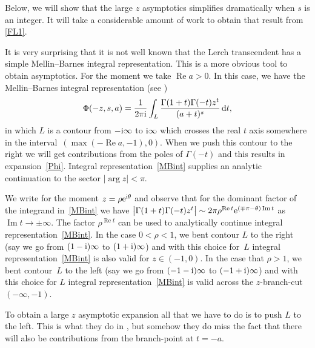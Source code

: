 \documentclass[pdftex]{sigma}
\numberwithin{equation}{section}
\def\expe{{\rm e}}
\def\iunit{{\rm i}}
\def\id{\,{\rm d}}
\begin{document}
Below, we will show that the large $z$ asymptotics simplifies dramatically
when $s$ is an integer. It will take a considerable amount of work to
obtain that result from \eqref{FL1}.

It is very surprising that it is not well known that the Lerch transcendent has a simple
Mellin--Barnes integral representation. This is a more obvious tool to obtain asymptotics.
For the moment we take $\operatorname{Re} a>0$. In this case,
we have the Mellin--Barnes integral representation (see \cite[equation~(3.11)]{Srivastava2011})
\begin{equation}\label{MBint}
 \Phi(-z,s,a)=\frac1{2\pi\iunit}\int_L
 \frac{\Gamma(1+t)\Gamma(-t)z^t}{(a+t)^s}\id t,
\end{equation}
in which $L$ is a contour from $-\iunit\infty$ to $\iunit\infty$ which crosses the
real $t$ axis somewhere in the interval~$(\max(-\operatorname{Re} a,-1),0)$. When we push this contour to the
right we will get contributions from the poles of $\Gamma(-t)$ and this results in
expansion~\eqref{Phi}. Integral representation~\eqref{MBint} supplies an
analytic continuation to the sector $|\arg z|<\pi$.

We write for the moment $z=\rho\expe^{\iunit\theta}$ and observe that for the dominant factor
of the integrand in~\eqref{MBint} we have
$\bigl|\Gamma(1+t)\Gamma(-t)z^t\bigr|\sim 2\pi \rho^{\operatorname{Re} t}\expe^{(\mp\pi-\theta)\operatorname{Im} t}$
as $\operatorname{Im} t\to\pm\infty$. The factor $\rho^{\operatorname{Re} t}$ can be used to analytically continue
integral representation~\eqref{MBint}.
In the case $0<\rho<1$, we bent contour $L$ to the right (say we go from $(1-\iunit)\infty$
to $(1+\iunit)\infty$) and with this choice for~$L$ integral representation~\eqref{MBint} is also valid for $z\in(-1,0)$.
In the case that $\rho>1$, we bent contour~$L$ to the
left (say we go from $(-1-\iunit)\infty$ to $(-1+\iunit)\infty$) and
with this choice for $L$ integral representation~\eqref{MBint}
is valid across the $z$-branch-cut $(-\infty,-1)$.

To obtain a large $z$ asymptotic expansion all that we have to do is to push $L$ to the
left. This is what they do in \cite{Srivastava2011}, but somehow they do miss the fact
that there will also be contributions from the branch-point at $t=-a$.
\end{document}
